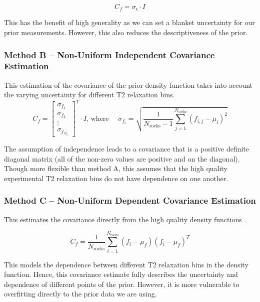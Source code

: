 \begin{equation}
    \label{eq:uniform_diagonal_covar}
    C_f = \sigma_\epsilon \cdot I
\end{equation}

This has the benefit of high generality as we can set a blanket uncertainty for our prior measurements. However, this also reduces the descriptiveness of the prior.

\subsubsection{Method B -- Non-Uniform Independent Covariance Estimation}
This estimation of the covariance of the prior density function takes into account the varying uncertainty for different T2 relaxation bins.
\begin{equation}
    \label{eq:nonuniform_diagonal_covar}
    C_f =      
    \begin{bmatrix}
    \sigma_{f_1}  \\
    \sigma_{f_2} \\
    \vdots \\
    \sigma_{f_{N_2}}
    \end{bmatrix} ^ T
    \cdot  I
    \text{,  where }
    \quad
    \sigma_{f_i} = 
    \sqrt{
    \frac{1}{N_{\text{rocks}}-1}
    \sum ^{N_{\text{rocks}}}_{j = 1}
    (f_{i,j} - \mu_i)^2
    }
\end{equation}

The assumption of independence leads to a covariance that is a positive definite diagonal matrix (all of the non-zero values are positive and on the diagonal). Though more flexible than method A, this assumes that the high quality experimental T2 relaxation bins do not have dependence on one another.



\subsubsection{Method C -- Non-Uniform Dependent Covariance Estimation}
This estimates the covariance directly from the high quality density functions \cite{DiscreteRandomSignalsBookCovarianceEst}.

\begin{equation}
    \label{eq:nonuniform_dependent_covar}
    C_f = \frac{1}{N_\text{rocks}} \sum^{N_\text{rocks}}_{i = 1} (f_i - \mu_f) (f_i - \mu_f)^T
\end{equation}


This models the dependence between different T2 relaxation bins in the density function. Hence, this covariance estimate fully describes the uncertainty and dependence of different points of the prior. However, it is more vulnerable to overfitting directly to the prior data we are using.



